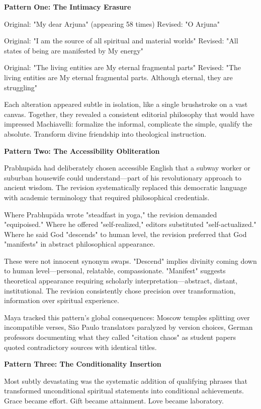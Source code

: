 \documentclass[11pt,twoside]{book}
\begin{document}
\textbf{\textbf{Pattern One: The Intimacy Erasure}}

Original: "My dear Arjuna" (appearing 58 times)
Revised: "O Arjuna" 

Original: "I am the source of all spiritual and material worlds"
Revised: "All states of being are manifested by My energy"

Original: "The living entities are My eternal fragmental parts"  
Revised: "The living entities are My eternal fragmental parts. Although eternal, they are struggling"

Each alteration appeared subtle in isolation, like a single brushstroke on a vast canvas. Together, they revealed a consistent editorial philosophy that would have impressed Machiavelli: formalize the informal, complicate the simple, qualify the absolute. Transform divine friendship into theological instruction.

\textbf{\textbf{Pattern Two: The Accessibility Obliteration}}

Prabhupāda had deliberately chosen accessible English that a subway worker or suburban housewife could understand—part of his revolutionary approach to ancient wisdom. The revision systematically replaced this democratic language with academic terminology that required philosophical credentials.

Where Prabhupāda wrote "steadfast in yoga," the revision demanded "equipoised." Where he offered "self-realized," editors substituted "self-actualized." Where he said God "descends" to human level, the revision preferred that God "manifests" in abstract philosophical appearance.

These were not innocent synonym swaps. "Descend" implies divinity coming down to human level—personal, relatable, compassionate. "Manifest" suggests theoretical appearance requiring scholarly interpretation—abstract, distant, institutional. The revision consistently chose precision over transformation, information over spiritual experience.

Maya tracked this pattern's global consequences: Moscow temples splitting over incompatible verses, São Paulo translators paralyzed by version choices, German professors documenting what they called "citation chaos" as student papers quoted contradictory sources with identical titles.

\textbf{\textbf{Pattern Three: The Conditionality Insertion}}

Most subtly devastating was the systematic addition of qualifying phrases that transformed unconditional spiritual statements into conditional achievements. Grace became effort. Gift became attainment. Love became laboratory.
\end{document}
